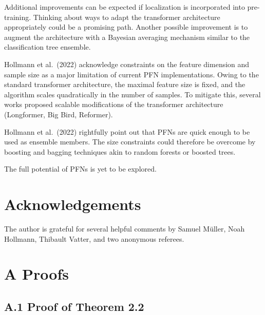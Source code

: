 \documentclass[aspectratio=169,10pt]{beamer}
\newcommand{\currentheading}{\ifx\insertsubsection\empty\insertsection\else\insertsubsection\fi}
\begin{document}
\begin{frame}{\currentheading}
Additional improvements can be expected if localization is incorporated into pre-training. Thinking about ways to adapt the transformer architecture appropriately could be a promising path. Another possible improvement is to augment the architecture with a Bayesian averaging mechanism similar to the classification tree ensemble.
\end{frame}

\begin{frame}{\currentheading}
Hollmann et al.\ (2022) acknowledge constraints on the feature dimension and sample size as a major limitation of current PFN implementations. Owing to the standard transformer architecture, the maximal feature size is fixed, and the algorithm scales quadratically in the number of samples. To mitigate this, several works proposed scalable modifications of the transformer architecture (Longformer, Big Bird, Reformer).
\end{frame}

\begin{frame}{\currentheading}
Hollmann et al.\ (2022) rightfully point out that PFNs are quick enough to be used as ensemble members. The size constraints could therefore be overcome by boosting and bagging techniques akin to random forests or boosted trees.
\end{frame}

\begin{frame}{\currentheading}
The full potential of PFNs is yet to be explored.
\end{frame}

\section*{Acknowledgements}

\begin{frame}{\currentheading}
The author is grateful for several helpful comments by Samuel Müller, Noah Hollmann, Thibault Vatter, and two anonymous referees.
\end{frame}

\appendix
\section{A Proofs}
\subsection{A.1 Proof of Theorem 2.2}
\end{document}
